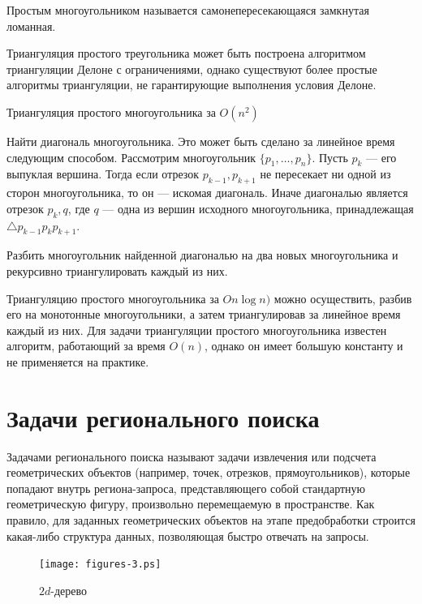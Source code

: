 \begin{define}
  Простым многоугольником называется самонепересекающаяся замкнутая
  ломанная.
\end{define}

Триангуляция простого треугольника может быть построена алгоритмом
триангуляции Делоне с ограничениями, однако существуют более простые
алгоритмы триангуляции, не гарантирующие выполнения условия Делоне.

\begin{algorithm}{Триангуляция простого многоугольника за $O(n^2)$}
\item Найти диагональ многоугольника. Это может быть сделано за
 линейное время следующим способом. Рассмотрим многоугольник $\{p_1,
 \ldots, p_n\}$. Пусть $p_k$ --- его выпуклая вершина. Тогда если
 отрезок $p_{k-1}, p_{k+1}$ не пересекает ни одной из сторон
 многоугольника, то он --- искомая диагональ. Иначе диагональю
 является отрезок $p_k,q$, где $q$ --- одна из вершин исходного
 многоугольника, принадлежащая $\triangle p_{k-1}p_kp_{k+1}$.
\item Разбить многоугольник найденной диагональю на два новых
  многоугольника и рекурсивно триангулировать каждый из них.
\end{algorithm}

Триангуляцию простого многоугольника за $On \log n)$ можно
осуществить, разбив его на монотонные многоугольники, а затем
триангулировав за линейное время каждый из них.
Для задачи триангуляции простого многоугольника известен алгоритм,
работающий за время $O(n)$, однако он имеет большую константу и не
применяется на практике.

\section{Задачи регионального поиска}
Задачами регионального поиска называют задачи извлечения или подсчета
геометрических объектов (например, точек, отрезков, прямоугольников),
которые попадают внутрь региона-запроса, представляющего собой стандартную
геометрическую фигуру, произвольно перемещаемую в пространстве.
Как правило, для заданных геометрических объектов на этапе
предобработки строится какая-либо структура данных, позволяющая быстро
отвечать на запросы.

\begin{figure}[t]
  \centering
  \texttt{[image: figures-3.ps]}
  \caption{$2d$-дерево}
  \label{fig:2d-tree}
\end{figure}


